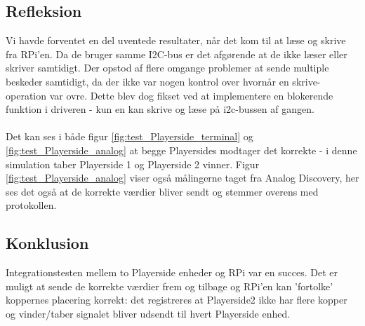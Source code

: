 \documentclass[Integrationstest/Integrationstest_main.tex]{subfiles}
\begin{document}
\subsection{Refleksion}
Vi havde forventet en del uventede resultater, når det kom til at læse og skrive fra RPi'en. Da de bruger samme I2C-bus er det afgørende at de ikke læser eller skriver samtidigt. Der opstod af flere omgange problemer at sende multiple beskeder samtidigt, da der ikke var nogen kontrol over hvornår en skrive-operation var ovre. Dette blev dog fikset ved at implementere en blokerende funktion i driveren - kun en kan skrive og læse på i2c-bussen af gangen. \\\\
Det kan ses i både figur \ref{fig:test_Playerside_terminal} og \ref{fig:test_Playerside_analog} at begge Playersides modtager det korrekte - i denne simulation taber Playerside 1 og Playerside 2 vinner. Figur \ref{fig:test_Playerside_analog} viser også målingerne taget fra Analog Discovery, her ses det også at de korrekte værdier bliver sendt og stemmer overens med protokollen.
\subsection{Konklusion}
Integrationstesten mellem to Playerside enheder og RPi var en succes. Det er muligt at sende de korrekte værdier frem og tilbage og RPi'en kan 'fortolke' koppernes placering korrekt: det registreres at Playerside2 ikke har flere kopper og vinder/taber signalet bliver udsendt til hvert Playerside enhed.
\end{document}
